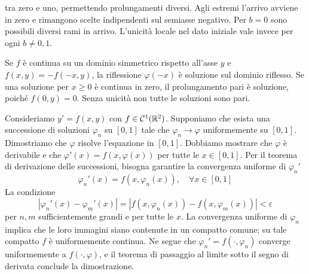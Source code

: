 \documentclass[a4paper]{article}
\begin{document}
\begin{radioactive}
\begin{snippetsolution}{}
\begin{enumerate}
            tra zero e uno, permettendo prolungamenti diversi.
            Agli estremi l'arrivo avviene in zero e rimangono scelte
            indipendenti sul semiasse negativo. Per \(b=0\) sono possibili
            diversi rami in arrivo. L'unicità locale nel dato iniziale
            vale invece per ogni \(b\neq0,1\).
    \end{enumerate}
\end{snippetsolution}
\end{radioactive}

\begin{radioactive}
Se \(f\) è continua su un dominio simmetrico rispetto all'asse \(y\)
e \(f(x,y)=-f(-x,y)\), la riflessione \(\varphi(-x)\) è soluzione
sul dominio riflesso. Se una soluzione per \(x\geq0\) è continua in zero,
il prolungamento pari è soluzione, poiché \(f(0,y)=0\).
Senza unicità non tutte le soluzioni sono pari.
\end{radioactive}

\begin{radioactive}
\begin{snippetexample}{}
    Consideriamo \(y'=f(x,y)\) con \(f \in \mathcal C^1(\mathbb{R}^2)\).
    Supponiamo che esista una successione di soluzioni \(\varphi_n\) su \([0,1]\) tale che \(\varphi_n \to \varphi\) uniformemente su \([0,1]\).
    Dimostriamo che \(\varphi\) risolve l'equazione in \([0,1]\).
    Dobbiamo mostrare che \(\varphi\) è derivabile e che \(\varphi'(x) = f(x,\varphi(x))\) per tutte le \(x\in[0,1]\).
    Per il teorema di derivazione delle successioni, bisogna garantire la convergenza uniforme di \(\varphi_n'\)
    \[
        \varphi_n'(x) = f(x,\varphi_n(x)), \quad \forall x\in [0,1]
    \]
    La condizione \[
        |\varphi_n'(x) - \varphi_m'(x)| = |f(x,\varphi_n(x)) - f(x,\varphi_m(x))| < \varepsilon
    \]
    per \(n,m\) sufficientemente grandi e per tutte le \(x\).
    La convergenza uniforme di \(\varphi_n\) implica che le loro immagini siano contenute in un compatto comune; su tale compatto \(f\) è uniformemente continua. Ne segue che \(\varphi_n' = f(\cdot,\varphi_n)\) converge uniformemente a \(f(\cdot,\varphi)\), e il teorema di passaggio al limite sotto il segno di derivata conclude la dimostrazione.
\end{snippetexample}
\end{radioactive}
\end{document}
